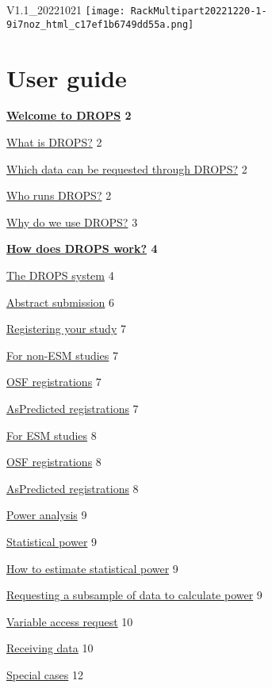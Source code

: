 \documentclass[
]{article}
\author{}
\date{\vspace{-2.5em}}
\begin{document}
V1.1\_20221021
\texttt{[image: RackMultipart20221220-1-9i7noz\_html\_c17ef1b6749dd55a.png]}

\hypertarget{user-guide}{%
\section{User guide}\label{user-guide}}

\textbf{\protect\hyperlink{_up3x7w38quym}{Welcome to DROPS} 2}

\protect\hyperlink{_paicald3w2xf}{What is DROPS?} 2

\protect\hyperlink{_6eanlztnrvpa}{Which data can be requested through
DROPS?} 2

\protect\hyperlink{_wqj08dx9lskp}{Who runs DROPS?} 2

\protect\hyperlink{_6pnjc4fh9u9i}{Why do we use DROPS?} 3

\textbf{\protect\hyperlink{_iryi1psurnbs}{How does DROPS work?} 4}

\protect\hyperlink{_w61ki29hp26j}{The DROPS system} 4

\protect\hyperlink{_c0rqoo2n1ad5}{Abstract submission} 6

\protect\hyperlink{_d60pemtq0onl}{Registering your study} 7

\protect\hyperlink{_j9vo6i2gjp6q}{For non-ESM studies} 7

\protect\hyperlink{_9l6plnofve8}{OSF registrations} 7

\protect\hyperlink{_dypi9oxebkkg}{AsPredicted registrations} 7

\protect\hyperlink{_4priwppr2d24}{For ESM studies} 8

\protect\hyperlink{_c7z830chg34n}{OSF registrations} 8

\protect\hyperlink{_7fg39v7hd0te}{AsPredicted registrations} 8

\protect\hyperlink{_qlx2etgrq9hr}{Power analysis} 9

\protect\hyperlink{_rnzjcirxyvgf}{Statistical power} 9

\protect\hyperlink{_bwod4c38xqma}{How to estimate statistical power} 9

\protect\hyperlink{_7h6c6a2xjdz9}{Requesting a subsample of data to
calculate power} 9

\protect\hyperlink{_2dzt9xeysbee}{Variable access request} 10

\protect\hyperlink{_45gpzwmgy9bj}{Receiving data} 10

\protect\hyperlink{_pcdajm75pc8x}{Special cases} 12
\end{document}
